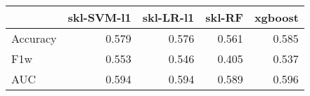 \begin{tabular}{lrrrr}
\toprule
{} &  skl-SVM-l1 &  skl-LR-l1 &  skl-RF &  xgboost \\
\midrule
Accuracy &       0.579 &      0.576 &   0.561 &    0.585 \\
F1w      &       0.553 &      0.546 &   0.405 &    0.537 \\
AUC      &       0.594 &      0.594 &   0.589 &    0.596 \\
\bottomrule
\end{tabular}
